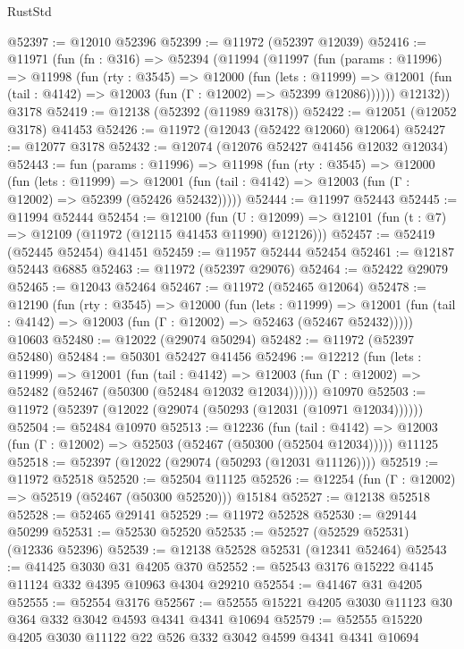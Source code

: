 \begin{lexlean}{RustStd}
\begin{coremodule}
@52397 := @12010 @52396
@52399 := @11972 (@52397 @12039)
@52416 := @11971
    (fun (fn : @316) =>
    @52394
      (@11994
        (@11997
          (fun (params : @11996) =>
          @11998
            (fun (rty : @3545) =>
            @12000
              (fun (lets : @11999) =>
              @12001 (fun (tail : @4142) => @12003 (fun (Γ : @12002) => @52399 @12086))))))
        @12132))
    @3178
@52419 := @12138 (@52392 (@11989 @3178))
@52422 := @12051 (@12052 @3178) @41453
@52426 := @11972 (@12043 (@52422 @12060) @12064)
@52427 := @12077 @3178
@52432 := @12074 (@12076 @52427 @41456 @12032 @12034)
@52443 := fun (params : @11996) =>
  @11998
    (fun (rty : @3545) =>
    @12000
      (fun (lets : @11999) =>
      @12001 (fun (tail : @4142) => @12003 (fun (Γ : @12002) => @52399 (@52426 @52432)))))
@52444 := @11997 @52443
@52445 := @11994 @52444
@52454 := @12100
    (fun (U : @12099) => @12101 (fun (t : @7) => @12109 (@11972 (@12115 @41453 @11990) @12126)))
@52457 := @52419 (@52445 @52454) @41451
@52459 := @11957 @52444 @52454
@52461 := @12187 @52443 @6885
@52463 := @11972 (@52397 @29076)
@52464 := @52422 @29079
@52465 := @12043 @52464
@52467 := @11972 (@52465 @12064)
@52478 := @12190
    (fun (rty : @3545) =>
    @12000
      (fun (lets : @11999) =>
      @12001 (fun (tail : @4142) => @12003 (fun (Γ : @12002) => @52463 (@52467 @52432)))))
    @10603
@52480 := @12022 (@29074 @50294)
@52482 := @11972 (@52397 @52480)
@52484 := @50301 @52427 @41456
@52496 := @12212
    (fun (lets : @11999) =>
    @12001
      (fun (tail : @4142) =>
      @12003 (fun (Γ : @12002) => @52482 (@52467 (@50300 (@52484 @12032 @12034))))))
    @10970
@52503 := @11972 (@52397 (@12022 (@29074 (@50293 (@12031 (@10971 @12034))))))
@52504 := @52484 @10970
@52513 := @12236
    (fun (tail : @4142) => @12003 (fun (Γ : @12002) => @52503 (@52467 (@50300 (@52504 @12034)))))
    @11125
@52518 := @52397 (@12022 (@29074 (@50293 (@12031 @11126))))
@52519 := @11972 @52518
@52520 := @52504 @11125
@52526 := @12254 (fun (Γ : @12002) => @52519 (@52467 (@50300 @52520))) @15184
@52527 := @12138 @52518
@52528 := @52465 @29141
@52529 := @11972 @52528
@52530 := @29144 @50299
@52531 := @52530 @52520
@52535 := @52527 (@52529 @52531) (@12336 @52396)
@52539 := @12138 @52528 @52531 (@12341 @52464)
@52543 := @41425 @3030 @31 @4205 @370
@52552 := @52543 @3176 @15222 @4145 @11124 @332 @4395 @10963 @4304 @29210
@52554 := @41467 @31 @4205
@52555 := @52554 @3176
@52567 := @52555 @15221 @4205 @3030 @11123 @30 @364 @332 @3042 @4593 @4341 @4341 @10694
@52579 := @52555 @15220 @4205 @3030 @11122 @22 @526 @332 @3042 @4599 @4341 @4341 @10694

\end{coremodule}
\end{lexlean}
